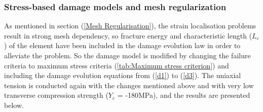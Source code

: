 \documentclass[12pt,a4paper,twoside,openright]{report}
\begin{document}
\subsubsection{Stress-based damage models and mesh regularization}
\indent\indent\indent As mentioned in section (\ref{Mesh Regularisation}), the strain localisation problems result in strong mesh dependency, so fracture energy and characteristic length ($L_{c}$) of the element have been included in the damage evolution law in order to alleviate the problem. So the damage model is modified by changing the failure criteria to maximum stress criteria (\ref{tab:Maximum stress criterion}) and including the damage evolution equations from (\ref{d1}) to (\ref{d3}). The uniaxial tension is conducted again with the changes mentioned above and with very low transverse compression strength ($Y_{c}$ = -180MPa), and the results are presented below.
\end{document}
